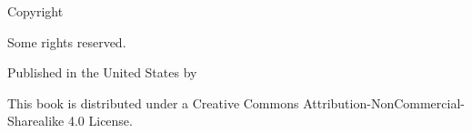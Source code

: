 \pagestyle{empty}

  \begin{center} 

  \sansfont
  
  \makeatletter  \small \@title \par \makeatother
    
    Copyright \ccLogo\ \makeatletter \@date \ \@author \makeatother \par
    Some rights reserved. \par
    
    \vspace{0.4cm}

    Published in the United States by \par
    
    \publisher \par
    
    \website \par
    
    \vspace{0.4cm}

    This book is distributed under a Creative Commons Attribution-NonCommercial-Sharealike 4.0 License. \par

    \vspace{0.4cm}

    \ccbyncsa
    
  \end{center}
       
